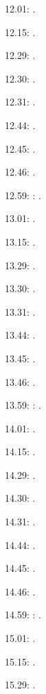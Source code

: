\documentclass[italian]{article}
\begin{document}
12.01:    . 

12.15:    . 

12.29:    . 

12.30:    .

12.31:    .

12.44:    .

12.45:    .

12.46:    .

12.59:    
:    . 

13.01:     . 

13.15:     . 

13.29:     . 

13.30:     .

13.31:     .

13.44:     .

13.45:     .

13.46:     .

13.59:     
:    .

14.01:     . 

14.15:     . 

14.29:     . 

14.30:     .

14.31:     .

14.44:     .

14.45:     .

14.46:     .

14.59:     
:    .

15.01:     . 

15.15:     . 

15.29:     . 
\end{document}
